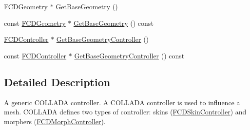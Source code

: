 \begin{DoxyCompactItemize}
\item 
\hyperlink{classFCDGeometry}{FCDGeometry} $\ast$ \hyperlink{classFCDController_a407cb338a97fee2bd37ebc7899ee40a8}{GetBaseGeometry} ()
\item 
const \hyperlink{classFCDGeometry}{FCDGeometry} $\ast$ \hyperlink{classFCDController_a9b1bff949a4081b474c0946154ce0034}{GetBaseGeometry} () const 
\item 
\hyperlink{classFCDController}{FCDController} $\ast$ \hyperlink{classFCDController_a270b0e643d2b2e104cc057d611ec5ca8}{GetBaseGeometryController} ()
\item 
const \hyperlink{classFCDController}{FCDController} $\ast$ \hyperlink{classFCDController_ae9a274dc0c85e5de8461810272807374}{GetBaseGeometryController} () const 
\end{DoxyCompactItemize}


\subsection{Detailed Description}
A generic COLLADA controller. A COLLADA controller is used to influence a mesh. COLLADA defines two types of controller: skins (\hyperlink{classFCDSkinController}{FCDSkinController}) and morphers (\hyperlink{classFCDMorphController}{FCDMorphController}). 

